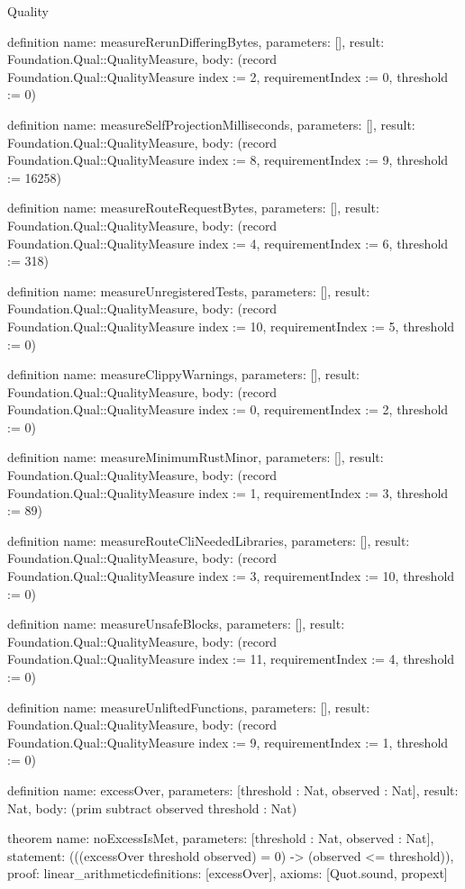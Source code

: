 \begin{lexlean}{Quality}
\begin{semanticmodule}
definition{
  name: measureRerunDifferingBytes,
  parameters: [],
  result: Foundation.Qual::QualityMeasure,
  body: (record Foundation.Qual::QualityMeasure {index := 2, requirementIndex := 0, threshold := 0})
}

definition{
  name: measureSelfProjectionMilliseconds,
  parameters: [],
  result: Foundation.Qual::QualityMeasure,
  body: (record Foundation.Qual::QualityMeasure {index := 8, requirementIndex := 9, threshold := 16258})
}

definition{
  name: measureRouteRequestBytes,
  parameters: [],
  result: Foundation.Qual::QualityMeasure,
  body: (record Foundation.Qual::QualityMeasure {index := 4, requirementIndex := 6, threshold := 318})
}

definition{
  name: measureUnregisteredTests,
  parameters: [],
  result: Foundation.Qual::QualityMeasure,
  body: (record Foundation.Qual::QualityMeasure {index := 10, requirementIndex := 5, threshold := 0})
}

definition{
  name: measureClippyWarnings,
  parameters: [],
  result: Foundation.Qual::QualityMeasure,
  body: (record Foundation.Qual::QualityMeasure {index := 0, requirementIndex := 2, threshold := 0})
}

definition{
  name: measureMinimumRustMinor,
  parameters: [],
  result: Foundation.Qual::QualityMeasure,
  body: (record Foundation.Qual::QualityMeasure {index := 1, requirementIndex := 3, threshold := 89})
}

definition{
  name: measureRouteCliNeededLibraries,
  parameters: [],
  result: Foundation.Qual::QualityMeasure,
  body: (record Foundation.Qual::QualityMeasure {index := 3, requirementIndex := 10, threshold := 0})
}

definition{
  name: measureUnsafeBlocks,
  parameters: [],
  result: Foundation.Qual::QualityMeasure,
  body: (record Foundation.Qual::QualityMeasure {index := 11, requirementIndex := 4, threshold := 0})
}

definition{
  name: measureUnliftedFunctions,
  parameters: [],
  result: Foundation.Qual::QualityMeasure,
  body: (record Foundation.Qual::QualityMeasure {index := 9, requirementIndex := 1, threshold := 0})
}

definition{
  name: excessOver,
  parameters: [threshold : Nat, observed : Nat],
  result: Nat,
  body: (prim subtract observed threshold : Nat)
}

theorem{
  name: noExcessIsMet,
  parameters: [threshold : Nat, observed : Nat],
  statement: (((excessOver threshold observed) = 0) -> (observed <= threshold)),
  proof: linear_arithmetic{definitions: [excessOver]},
  axioms: [Quot.sound, propext]
}


\end{semanticmodule}
\end{lexlean}
